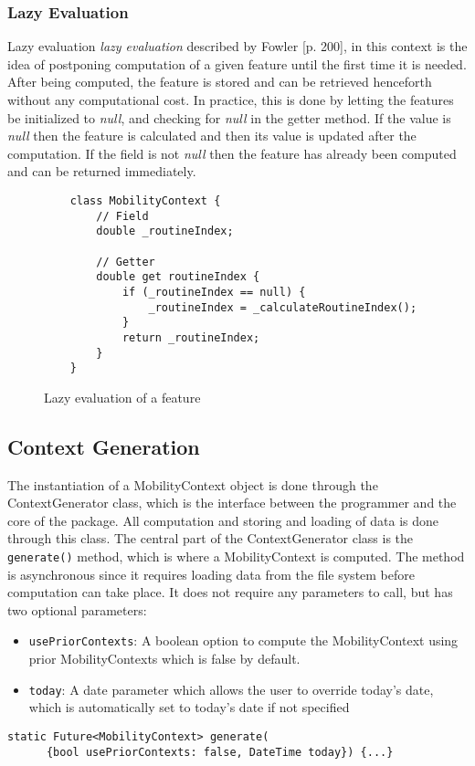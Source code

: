 \subsubsection*{Lazy Evaluation}
Lazy evaluation \textit{lazy evaluation} described by Fowler \cite{fowler-PEEA} [p. 200], in this context is the idea of postponing computation of a given feature until the first time it is needed. After being computed, the feature is stored and can be retrieved henceforth without any computational cost. In practice, this is done by letting the features be initialized to \textit{null}, and checking for \textit{null} in the getter method. If the value is \textit{null} then the feature is calculated and then its value is updated after the computation. If the field is not \textit{null} then the feature has already been computed and can be returned immediately.

\begin{figure}[h]
    \centering
    \begin{verbatim}
    class MobilityContext {
        // Field
        double _routineIndex;
        
        // Getter
        double get routineIndex {
            if (_routineIndex == null) {
                _routineIndex = _calculateRoutineIndex();
            }
            return _routineIndex;
        }
    }
    \end{verbatim}
    \caption{Lazy evaluation of a feature}
    \label{fig:lazy-evaluation}
\end{figure}


\subsection{Context Generation}
\label{subsection:context-generation}
The instantiation of a MobilityContext object is done through the ContextGenerator class, which is the interface between the programmer and the core of the package. All computation and storing and loading of data is done through this class.  The central part of the ContextGenerator class is the \verb|generate()| method, which is where a MobilityContext is computed. The method is asynchronous since it requires loading data from the file system before computation can take place. It does not require any parameters to call, but has two optional parameters: 

\begin{itemize}
    \item \verb|usePriorContexts|: A boolean option to compute the MobilityContext using prior MobilityContexts which is false by default. \item  \verb|today|: A date parameter which allows the user to override today's date, which is automatically set to today's date if not specified

\end{itemize}
\begin{verbatim}
static Future<MobilityContext> generate(
      {bool usePriorContexts: false, DateTime today}) {...}
\end{verbatim}


